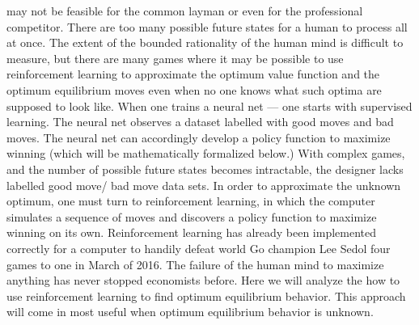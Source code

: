 \documentclass[11pt]{article}
\begin{document}
may not be feasible for the common layman or even for the professional competitor. There are
too many possible future states for a human to process all at once.
The extent of the bounded rationality of the human mind is difficult to measure, but there are
many games where it may be possible to use reinforcement learning to approximate the optimum
value function and the optimum equilibrium moves even when no one knows what such optima
are supposed to look like.
When one trains a neural net --- one starts with supervised learning. The neural net observes
a dataset labelled with good moves and bad moves. The neural net can accordingly develop a
policy function to maximize winning (which will be mathematically formalized below.)
With complex games, and the number of possible future states becomes intractable, the
designer lacks labelled good move/ bad move data sets. In order to approximate the unknown
optimum, one must turn to reinforcement learning, in which the computer simulates a sequence
of moves and discovers a policy function to maximize winning on its own. Reinforcement learning
has already been implemented correctly for a computer to handily defeat world Go champion
Lee Sedol four games to one in March of 2016.
The failure of the human mind to maximize anything has never stopped economists before.
Here we will analyze the how to use reinforcement learning to find optimum equilibrium behavior.
This approach will come in most useful when optimum equilibrium behavior is unknown.
\end{document}
